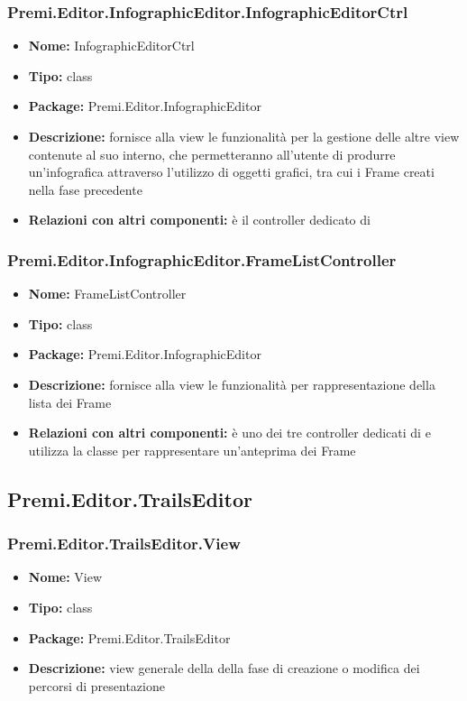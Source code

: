 \subsubsection{Premi.Editor.InfographicEditor.InfographicEditorCtrl}
\begin{itemize}
  \item \textbf{Nome:} InfographicEditorCtrl
  \item \textbf{Tipo:} class
  \item \textbf{Package:} Premi.Editor.InfographicEditor
  \item \textbf{Descrizione:} fornisce alla view le funzionalità per la gestione delle altre view contenute al suo interno, che permetteranno all'utente di produrre un'infografica attraverso l'utilizzo di oggetti grafici, tra cui i Frame creati nella fase precedente
  \item \textbf{Relazioni con altri componenti:} è il controller dedicato di   
\end{itemize}
\subsubsection{Premi.Editor.InfographicEditor.FrameListController}
\begin{itemize}
  \item \textbf{Nome:} FrameListController
  \item \textbf{Tipo:} class
  \item \textbf{Package:} Premi.Editor.InfographicEditor
  \item \textbf{Descrizione:} fornisce alla view  le funzionalità per rappresentazione della lista dei Frame
  \item \textbf{Relazioni con altri componenti:} è uno dei tre controller dedicati di    e utilizza la classe  per rappresentare un'anteprima dei Frame
\end{itemize}

\subsection{Premi.Editor.TrailsEditor}
\subsubsection{Premi.Editor.TrailsEditor.View}
\begin{itemize}
  \item \textbf{Nome:} View
  \item \textbf{Tipo:} class
  \item \textbf{Package:} Premi.Editor.TrailsEditor
  \item \textbf{Descrizione:} view generale della della fase di creazione o modifica dei percorsi di presentazione
\end{itemize}
